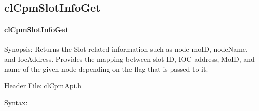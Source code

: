 {\subsection{clCpmSlotInfoGet}
\hypertarget{pagecpm203}{}\paragraph{cl\-Cpm\-Slot\-Info\-Get}\label{pagecpm203}
\begin{Desc}
\item[Synopsis:]Returns the Slot related information such as node mo\-ID, node\-Name, and Ioc\-Address. Provides the mapping between slot ID, 
IOC address, MoID, and name of the given node depending on the flag that is passed to it.\end{Desc}
\begin{Desc}
\item[Header File:]clCpmApi.h\end{Desc}
\begin{Desc}
\item[Syntax:]


\end{Desc}}
